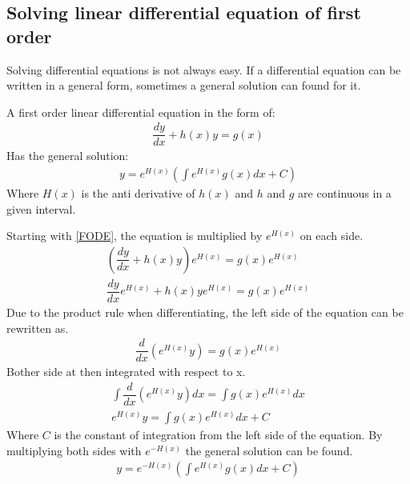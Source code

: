 \subsection{Solving linear differential equation of first order}
Solving differential equations is not always easy. If a differential equation can be written in a general form, sometimes a general solution can found for it.
\begin{tcolorbox}[colback=green!5!white,colframe=green!40!black,title=Theorem 2.1: General solution to a linear differential equation of the first order]
A first order linear differential equation in the form of:
\begin{align} \label{FODE}
\dfrac{dy}{dx}+h(x)y=g(x)
\end{align}
Has the general solution:
\begin{align}
y=e^{H(x)}\left(\int e^{H(x)}g(x)dx+C\right)
\end{align}
Where $H(x)$ is the anti derivative of $h(x)$ and $h$ and $g$ are continuous in a given interval.
\end{tcolorbox}
\begin{tcolorbox}[colback=gray!5!white,colframe=gray!!black,title=Proof 2.1]
Starting with \eqref{FODE}, the equation is multiplied by $e^{H(x)}$ on each side.
\begin{align*}
\left(\dfrac{dy}{dx}+h(x)y\right)e^{H(x)}=g(x)e^{H(x)}
\\
\dfrac{dy}{dx}e^{H(x)}+h(x)ye^{H(x)}=g(x)e^{H(x)}
\end{align*}
Due to the product rule when differentiating, the left side of the equation can be rewritten as.
\begin{align*}
\dfrac{d}{dx}\left(e^{H(x)}y\right)=g(x)e^{H(x)}
\end{align*}
Bother side at then integrated with respect to x.
\begin{align*}
\int\dfrac{d}{dx}\left(e^{H(x)}y\right)dx=\int g(x)e^{H(x)}dx
\\
e^{H(x)}y=\int g(x)e^{H(x)}dx+C
\end{align*}
Where $C$ is the constant of integration from the left side of the  equation. By multiplying both sides with $e^{-H(x)}$ the general solution can be found.
\begin{align}
y=e^{-H(x)}\left(\int e^{H(x)}g(x)dx+C\right)
\end{align}
\end{tcolorbox}

